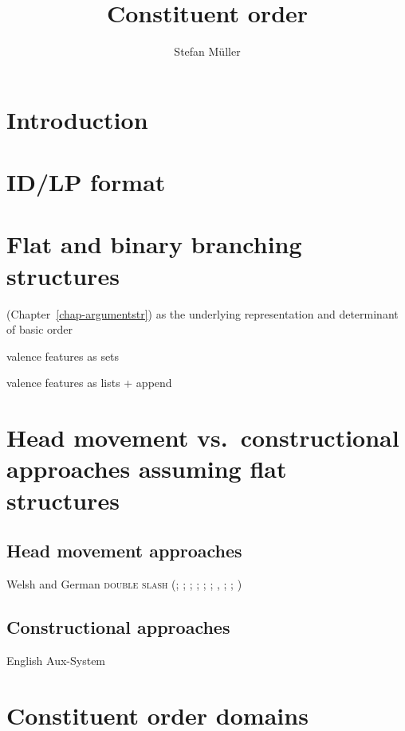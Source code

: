 \documentclass[output=paper]{langsci/langscibook}
\author{%
	Stefan Müller\affiliation{Humboldt-Universität zu Berlin}%
}
\title{Constituent order}
\begin{document}
\label{chap:constituents}

\section{Introduction} 



\section{ID/LP format}

\citet*{GKPS85a}

\section{Flat and binary branching structures}

\argst (Chapter~\ref{chap-argumentstr}) as the underlying representation and determinant of basic order

valence features as sets \citep*{Gunji86a,HN89a,Pollard90a,EEU92a}

valence features as lists + append \citep{MuellerHPSGHandbook}


\section{Head movement vs.\ constructional approaches assuming flat structures}

\subsection{Head movement approaches}

Welsh \citep{Borsley89} and German \textsc{double slash} 
(\citealp*[Section~4.7]{KW91a}; \citealp{Oliva92a}; \citealp*{Netter92};   
\citealp*{Kiss93}; \citealp*{Frank94}; \citealp*{Kiss95a}; \citealp{Feldhaus97},
\citealp{Meurers2000b}; \citealp{Mueller2005c}; \citealp{MuellerGS})

\subsection{Constructional approaches}

English Aux-System \citep{Fillmore99a,Sag2018a}

\section{Constituent order domains}
\end{document}
